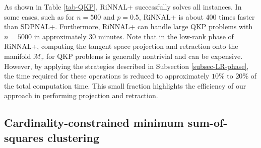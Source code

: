 \documentclass[11pt]{article}
\theoremstyle{plain}
\def\M{\mathcal{M}}
\begin{document}
As shown in Table \ref{tab-QKP}, RiNNAL+ successfully solves all instances. In some cases, such as for $n=500$ and $p=0.5$, RiNNAL+ is about 400 times faster than SDPNAL+. Furthermore, RiNNAL+ can handle large QKP problems with $n=5000$ in approximately 30 minutes. Note that in the low-rank phase of RiNNAL+, computing the tangent space projection and retraction onto the manifold $\M_r$ for QKP problems is generally nontrivial and can be expensive. However, by applying the strategies described in Subsection \ref{subsec-LR-phase}, the time required for these operations is reduced to approximately $10\%$ to $20\%$ of the total computation time. This small fraction highlights the efficiency of our approach in performing projection and retraction.


\subsection{Cardinality-constrained minimum sum-of-squares clustering}\label{subsec-ccMSCC}
\end{document}
